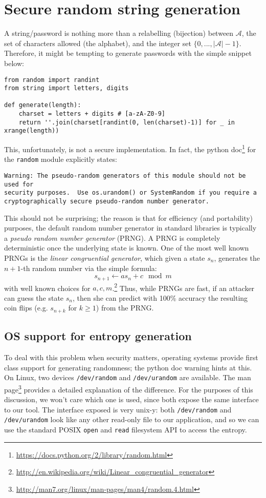 \documentclass[10pt]{article}
\newcommand{\A}{\mathcal{A}}
\newcommand{\abs}[1]{\left| #1 \right|}
\begin{document}
\section{Secure random string generation}
A string/password is nothing more than a relabelling (bijection) between $\A$,
the set of characters allowed (the alphabet), and the integer set $\{0, ...,
\abs{\A}-1\}$. Therefore, it might be tempting to generate passwords with the 
simple snippet below:
\begin{verbatim}
from random import randint
from string import letters, digits

def generate(length):
    charset = letters + digits # [a-zA-Z0-9]
    return ''.join(charset[randint(0, len(charset)-1)] for _ in xrange(length))
\end{verbatim}
This, unfortunately, is not a secure implementation. In fact, the python
doc\footnote{\url{https://docs.python.org/2/library/random.html}} for the
\verb|random| module explicitly states:
\begin{verbatim}
Warning: The pseudo-random generators of this module should not be used for
security purposes.  Use os.urandom() or SystemRandom if you require a
cryptographically secure pseudo-random number generator.
\end{verbatim}
This should not be surprising; the reason is that for efficiency (and
portability) purposes, the default random number generator in standard
libraries is typically a \emph{pseudo random number generator} (PRNG).  A PRNG
is completely deterministic once the underlying state is known.  One of
the most well known PRNGs is the \emph{linear congruential generator}, which
given a state $s_n$, generates the $n+1$-th random number via the simple formula:
\begin{equation*}
  s_{n+1} \gets a s_n + c \mod{m}
\end{equation*}
with well known choices for $a, c,
m$.\footnote{\url{http://en.wikipedia.org/wiki/Linear_congruential_generator}}
Thus, while PRNGs are fast, if an attacker can guess the state $s_n$, then she
can predict with 100\% accuracy the resulting coin flips (e.g. $s_{n+k}$ for $k
\geq 1$) from the PRNG.

\subsection{OS support for entropy generation} To deal with this problem when
security matters, operating systems provide first class support for generating
randomness; the python doc warning hints at this. On Linux, two devices
\texttt{/dev/random} and \texttt{/dev/urandom} are available. The man
page\footnote{\url{http://man7.org/linux/man-pages/man4/random.4.html}}
provides a detailed explanation of the difference. For the purposes of this
discussion, we won't care which one is used, since both expose the same
interface to our tool. The interface exposed is very unix-y: both
\texttt{/dev/random} and \texttt{/dev/urandom} look like any other read-only
file to our application, and so we can use the standard POSIX \verb|open| and
\verb|read| filesystem API to access the entropy.
\end{document}
